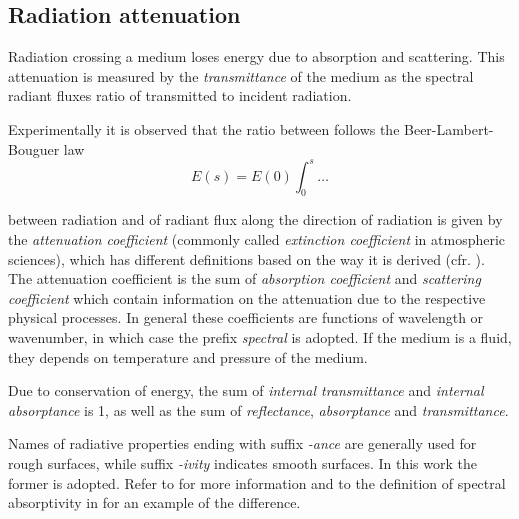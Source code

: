 \documentclass[a4paper,10pt,twocolumn,\classoptions]{article}
\begin{document}
\subsection{Radiation attenuation}
\label{sec:Radiation attenuation}
Radiation crossing a medium loses energy due to absorption and scattering. This attenuation is measured by the \emph{transmittance} of the medium as the spectral radiant fluxes ratio of transmitted to incident radiation.

Experimentally it is observed that the ratio between follows the Beer-Lambert-Bouguer law
\begin{equation}
  \label{eq:extinction_law}
  E(s) = E(0) \int_0^s \dots
\end{equation}

between radiation and  of radiant flux along the direction of radiation is given by the \emph{attenuation coefficient} (commonly called \emph{extinction coefficient} in atmospheric sciences), which has different definitions based on the way it is derived (cfr. \cite[44]{Catling}). The attenuation coefficient is the sum of \emph{absorption coefficient} and \emph{scattering coefficient} which contain information on the attenuation due to the respective physical processes.
In general these coefficients are functions of wavelength or wavenumber, in which case the prefix \emph{spectral} is adopted. If the medium is a fluid, they depends on temperature and pressure of the medium.

Due to conservation of energy, the sum of \emph{internal transmittance} and \emph{internal absorptance} is 1, as well as the sum of \emph{reflectance}, \emph{absorptance} and \emph{transmittance}.

Names of radiative properties ending with suffix \emph{-ance} are generally used for rough surfaces, while suffix \emph{-ivity} indicates smooth surfaces. In this work the former is adopted. Refer to \cite[20]{Modest} for more information and to the definition of spectral absorptivity in \cite{CIE} for an example of the difference.
\end{document}
